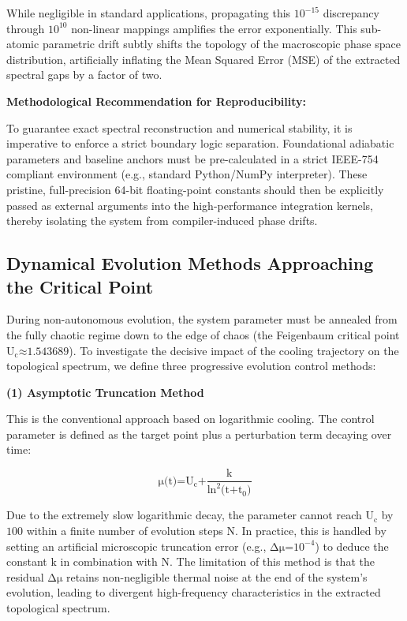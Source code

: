 While negligible in standard applications, propagating this
\(\text{10}^{\text{−15}}\) discrepancy through \(\text{10}^{\text{10}}\)
non-linear mappings amplifies the error exponentially. This sub-atomic
parametric drift subtly shifts the topology of the macroscopic phase
space distribution, artificially inflating the Mean Squared Error (MSE)
of the extracted spectral gaps by a factor of two.

\textbf{Methodological Recommendation for Reproducibility:}

To guarantee exact spectral reconstruction and numerical stability, it
is imperative to enforce a strict boundary logic separation.
Foundational adiabatic parameters and baseline anchors must be
pre-calculated in a strict IEEE-754 compliant environment (e.g.,
standard Python/NumPy interpreter). These pristine, full-precision
64-bit floating-point constants should then be explicitly passed as
external arguments into the high-performance integration kernels,
thereby isolating the system from compiler-induced phase drifts.

\subsection*{Dynamical Evolution Methods Approaching the Critical Point}

During non-autonomous evolution, the system parameter must be annealed
from the fully chaotic regime down to the edge of chaos (the Feigenbaum
critical point \(\text{U}_{\text{c}}\text{≈1.543689}\)). To investigate
the decisive impact of the cooling trajectory on the topological
spectrum, we define three progressive evolution control methods:

\textbf{(1) Asymptotic Truncation Method}

This is the conventional approach based on logarithmic cooling. The
control parameter is defined as the target point plus a perturbation
term decaying over time:

\[\text{μ}\text{(}\text{t}\text{)=}\text{U}_{\text{c}}\text{+}\frac{\text{k}}{\text{ln}^{\text{2}}\text{(}\text{t}\text{+}\text{t}_{\text{0}}\text{)}}\]

Due to the extremely slow logarithmic decay, the parameter cannot reach
\(\text{U}_{\text{c}}\) by \(\text{100}\) within a finite number of
evolution steps \(\text{N}\). In practice, this is handled by setting an
artificial microscopic truncation error (e.g.,
\(\text{Δ}\text{μ}\text{=}\text{10}^{\text{−4}}\)) to deduce the
constant \(\text{k}\) in combination with \(\text{N}\). The limitation
of this method is that the residual \(\text{Δ}\text{μ}\) retains
non-negligible thermal noise at the end of the system's evolution,
leading to divergent high-frequency characteristics in the extracted
topological spectrum.

